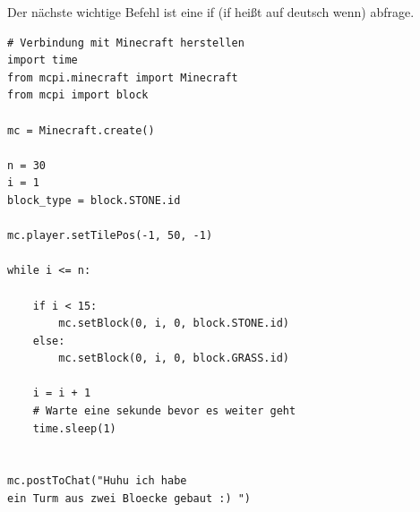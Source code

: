 Der nächste wichtige Befehl ist eine if (if heißt auf deutsch wenn) abfrage.

\lstset{language=Python}
\lstset{frame=lines}
\lstset{basicstyle=\footnotesize}
\begin{lstlisting}
# Verbindung mit Minecraft herstellen
import time
from mcpi.minecraft import Minecraft
from mcpi import block

mc = Minecraft.create()

n = 30   
i = 1
block_type = block.STONE.id

mc.player.setTilePos(-1, 50, -1)

while i <= n:

	if i < 15:
		mc.setBlock(0, i, 0, block.STONE.id)
	else:
		mc.setBlock(0, i, 0, block.GRASS.id)
		
	i = i + 1
	# Warte eine sekunde bevor es weiter geht
	time.sleep(1)				
	

mc.postToChat("Huhu ich habe 
ein Turm aus zwei Bloecke gebaut :) ")
\end{lstlisting}



